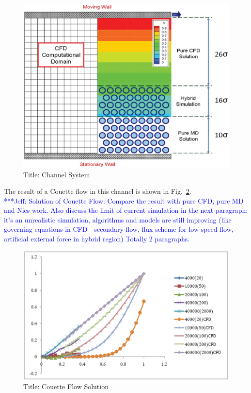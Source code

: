\documentclass[conference,final]{IEEEtran}
\newcommand{\skonote}[1]{ {\textcolor{blue} { ***Jeff: #1 }}}
\newcommand{\skonote}[1]{}
\begin{document}
\begin{figure}
\centering
\includegraphics[scale=0.3]{Channel_Mesh.eps}
\caption{\small Title: Channel System}
\label{Fig:Channel_Mesh}
\vspace{-1em}
\end{figure}


The result of a Couette flow in this channel is shown in Fig.~\ref{Fig:Solution_Couette}.\\
\skonote{Solution of Couette Flow: Compare the result with pure CFD, pure MD and Nies work. Also discuss the limit of current simulation in the next paragraph: it's an unrealistic simulation, algorithms and models are still improving (like governing equations in CFD - secondary flow, flux scheme for low speed flow, artificial external force in hybrid region) Totally 2 paragraphs.}
\newline
\newline


\begin{figure}
\centering
\includegraphics[scale=0.3]{Solution_Couette.eps}
\caption{\small Title: Couette Flow Solution}
\label{Fig:Solution_Couette}
\vspace{-1em}
\end{figure}
\end{document}
